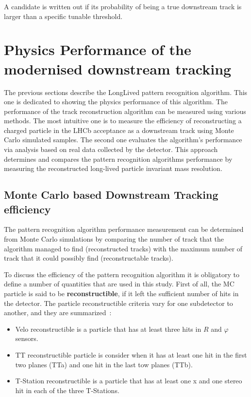 A candidate is written out if its probability of being a true downstream track is larger than a specific tunable threshold.

\section{Physics Performance of the modernised downstream tracking}
\label{sec:physic_performance}
The previous sections describe the LongLived pattern recognition algorithm. This one is dedicated to showing the physics performance of this algorithm. The performance of the track reconstruction algorithm can be measured using various methods. The most intuitive one is to measure the efficiency of reconstructing a charged particle in the LHCb acceptance as a downstream track using Monte Carlo simulated samples.
The second one evaluates the algorithm's performance via analysis based on real data collected by the detector. This approach determines and compares the pattern recognition algorithms performance by measuring the reconstructed long-lived particle invariant mass resolution.

\subsection{Monte Carlo based Downstream Tracking efficiency  }

The pattern recognition algorithm performance measurement can be determined from Monte Carlo simulations by comparing the number of track that the algorithm managed to find (reconstructed tracks) with the maximum number of track that it could possibly find (reconstructable tracks). 

To discuss the efficiency of the pattern recognition algorithm it is obligatory to define a number of quantities that are used in this study.  First of all, the MC particle is said to be \textbf{reconstructible}, if it left the sufficient number of hits in the detector. The particle reconstructible criteria vary for one subdetector to another, and they are summarized~\cite{track_def}:

\begin{itemize}
    \item Velo reconstructible is a particle that has at least three hits in $R$ and $\varphi$ sensors.
    \item TT reconstructible particle is consider when it has at least one hit in the first two planes (TTa) and one hit in the last tow planes (TTb). 
    \item T-Station reconstructible is a particle that has at least one x and one stereo hit in each of the three T-Stations. 
\end{itemize}

